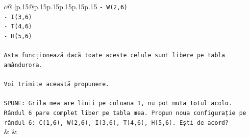 \documentclass{article}
\begin{document}
{\begin{supertabular}{c@{$\;$}|p{.15\linewidth}@{}p{.15\linewidth}p{.15\linewidth}p{.15\linewidth}p{.15\linewidth}p{.15\linewidth}}
{{{\texttt{{-} W(2,6)} \\
\texttt{{-} I(3,6)} \\
\texttt{{-} T(4,6)} \\
\texttt{{-} H(5,6)} \\
\\ 
\texttt{Asta funcționează dacă toate aceste celule sunt libere pe tabla amândurora.} \\
\\ 
\texttt{Voi trimite această propunere.} \\
\\ 
\texttt{SPUNE: Grila mea are linii pe coloana 1, nu pot muta totul acolo. Rândul 6 pare complet liber pe tabla mea. Propun noua configurație pe rândul 6: C(1,6), W(2,6), I(3,6), T(4,6), H(5,6). Ești de acord?} \\
            }
        }
    }
    & & \\ \\


\end{supertabular}}
\end{document}
